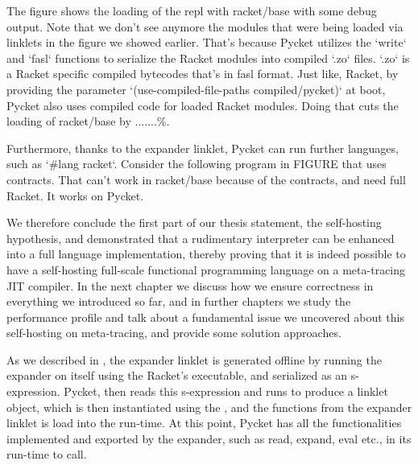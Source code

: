 
		\begin{paragraph-here}%
			The figure shows the loading of the repl with racket/base with some debug output. Note that we don't see anymore the modules that were being loaded via linklets in the figure we showed earlier. That's because Pycket utilizes the `write` and `fasl` functions to serialize the Racket modules into compiled `.zo` files. `.zo` is a Racket specific compiled bytecodes that's in fasl format. Just like, Racket, by providing the parameter `(use-compiled-file-paths compiled/pycket)` at boot, Pycket also uses compiled code for loaded Racket modules. Doing that cuts the loading of racket/base by .......\%.
		\end{paragraph-here}

		\begin{paragraph-here}%
			Furthermore, thanks to the expander linklet, Pycket can run further languages, such as `\#lang racket`. Consider the following program in FIGURE that uses contracts. That can't work in racket/base because of the contracts, and need full Racket. It works on Pycket.
		\end{paragraph-here}


		\begin{paragraph-here}%
			We therefore conclude the first part of our thesis statement, the self-hosting hypothesis, and demonstrated that a rudimentary interpreter can be enhanced into a full language implementation, thereby proving that it is indeed possible to have a self-hosting full-scale functional programming language on a meta-tracing JIT compiler.
			In the next chapter we discuss how we ensure correctness in everything we introduced so far, and in further chapters we study the performance profile and talk about a fundamental issue we uncovered about this self-hosting on meta-tracing, and provide some solution approaches.
		\end{paragraph-here}




As we described in , the expander linklet
is generated offline by running the expander on itself using the
Racket's executable, and serialized as an s-expression. Pycket, then
reads this s-expression and runs  to produce a
linklet object, which is then instantiated using the
, and the functions from the expander
linklet is load into the run-time. At this point, Pycket has all the
functionalities implemented and exported by the expander, such as
read, expand, eval etc., in its run-time to call.

